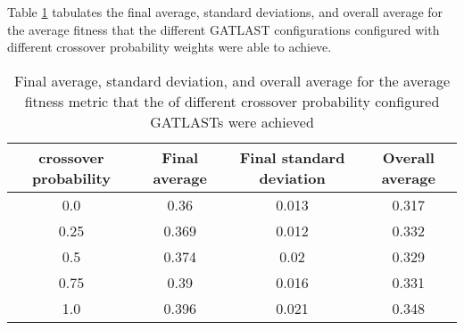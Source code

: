 Table \ref{tab:HP:GA:crossoverProp:average fitness} tabulates the final average, standard deviations, and overall average for the average fitness that the different GATLAST configurations configured with different crossover probability weights were able to achieve.
\begin{table}[tbh!]
\centering
\begin{adjustbox}{trim=0cm 0cm 0cm 0cm, clip=true}
\begin{tabular}{|c|c|c|c|}
\hline
crossover probability & Final average & Final standard deviation & Overall average\\
\hline
0.0 & 0.36 & 0.013 & 0.317\\\hline
0.25 & 0.369 & 0.012 & 0.332\\\hline
0.5 & 0.374 & 0.02 & 0.329\\\hline
0.75 & 0.39 & 0.016 & 0.331\\\hline
1.0 & 0.396 & 0.021 & 0.348\\\hline
\end{tabular}
\end{adjustbox}
\caption{Final average, standard deviation, and overall average for the average fitness metric that the of different crossover probability configured GATLASTs were achieved}
\label{tab:HP:GA:crossoverProp:average fitness}
\end{table}
